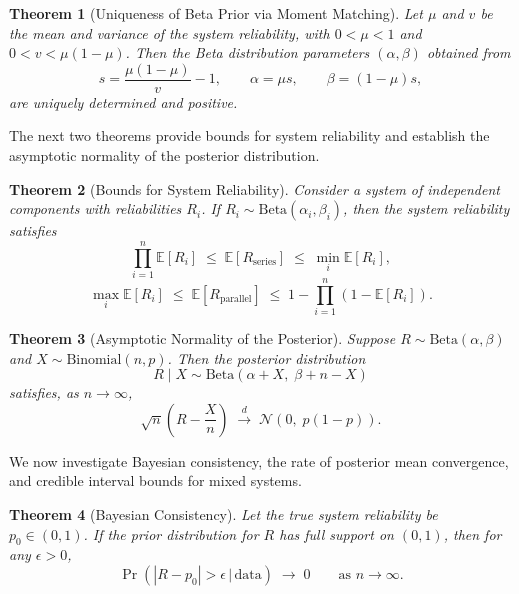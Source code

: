 \documentclass[twoside]{article}
\theoremstyle{plain}
\newtheorem{theorem}{Theorem}[section]
\theoremstyle{definition}
\begin{document}
\begin{theorem}[Uniqueness of Beta Prior via Moment Matching]
Let $\mu$ and $v$ be the mean and variance of the system reliability, with 
$0 < \mu < 1$ and $0 < v < \mu(1-\mu)$. 
Then the Beta distribution parameters $(\alpha,\beta)$ obtained from
$$
s = \frac{\mu(1-\mu)}{v} - 1,\qquad 
\alpha = \mu s, \qquad 
\beta = (1-\mu)s,
$$
are uniquely determined and positive.
\end{theorem}

The next two theorems provide bounds for system reliability and establish the asymptotic normality of the posterior distribution.

\begin{theorem}[Bounds for System Reliability]
Consider a system of independent components with reliabilities $R_i$.  
If $R_i \sim \text{Beta}(\alpha_i,\beta_i)$, then the system reliability satisfies
\begin{equation}
\prod_{i=1}^n \mathbb{E}[R_i] 
\;\leq\; \mathbb{E}[R_{\text{series}}] 
\;\leq\; \min_i \mathbb{E}[R_i],
\end{equation}
\begin{equation}
\max_i \mathbb{E}[R_i] 
\;\leq\; \mathbb{E}[R_{\text{parallel}}] 
\;\leq\; 1 - \prod_{i=1}^n (1 - \mathbb{E}[R_i]).
\end{equation}
\end{theorem}

\begin{theorem}[Asymptotic Normality of the Posterior]
Suppose $R \sim \text{Beta}(\alpha,\beta)$ and $X \sim \text{Binomial}(n,p)$.  
Then the posterior distribution
\begin{equation}
R \mid X \sim \text{Beta}(\alpha + X,\; \beta + n - X)
\end{equation}
satisfies, as $n \to \infty$,
\begin{equation}
\sqrt{n}\left(R - \frac{X}{n}\right)
\;\overset{d}{\longrightarrow}\;
\mathcal{N}\!\left(0,\; p(1-p)\right).
\end{equation}
\end{theorem}

We now investigate Bayesian consistency, the rate of posterior mean convergence, and credible interval bounds for mixed systems.

\begin{theorem}[Bayesian Consistency]
Let the true system reliability be $p_0 \in (0,1)$.  
If the prior distribution for $R$ has full support on $(0,1)$, then for any $\epsilon > 0$,
\begin{equation}
\Pr\!\left(|R - p_0| > \epsilon \,\big|\, \text{data}\right)
\;\longrightarrow\; 0
\qquad \text{as } n \to \infty.
\end{equation}
\end{theorem}
\end{document}
